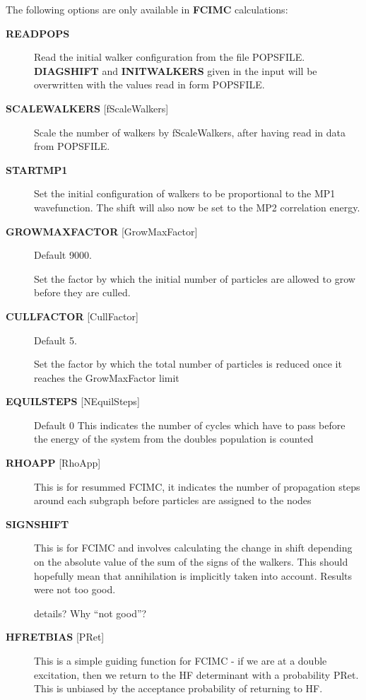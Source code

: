 \documentclass[openany,a4paper,10pt]{manual}
\begin{document}
The following options are only available in \textbf{FCIMC} calculations:
\begin{description}
\item[\textbf{READPOPS}]
Read the initial walker configuration from the file POPSFILE.
\textbf{DIAGSHIFT} and \textbf{INITWALKERS} given in the input will be
overwritten with the values read in form POPSFILE.

\item[\textbf{SCALEWALKERS} {[}fScaleWalkers{]}]
Scale the number of walkers by fScaleWalkers, after having read in data from POPSFILE.

\item[\textbf{STARTMP1}]
Set the initial configuration of walkers to be proportional to the MP1 wavefunction. The shift will also
now be set to the MP2 correlation energy.

\item[\textbf{GROWMAXFACTOR} {[}GrowMaxFactor{]}]
Default 9000.

Set the factor by which the initial number of particles are allowed to grow before
they are culled.

\item[\textbf{CULLFACTOR} {[}CullFactor{]}]
Default 5.

Set the factor by which the total number of particles is reduced once it reaches the GrowMaxFactor limit

\item[\textbf{EQUILSTEPS} {[}NEquilSteps{]}]
Default 0
This indicates the number of cycles which have to
pass before the energy of the system from the doubles
population is counted

\item[\textbf{RHOAPP} {[}RhoApp{]}]
This is for resummed FCIMC, it indicates the number of propagation steps
around each subgraph before particles are assigned to the nodes

\item[\textbf{SIGNSHIFT}]
This is for FCIMC and involves calculating the change in shift depending on
the absolute value of the sum of the signs of the walkers.  This should
hopefully mean that annihilation is implicitly taken into account. Results
were not too good.

\begin{notice}[note]
details?  Why ``not good''?
\end{notice}

\item[\textbf{HFRETBIAS} {[}PRet{]}]
This is a simple guiding function for FCIMC - if we are at a double
excitation, then we return to the HF determinant with a probability PRet.
This is unbiased by the acceptance probability of returning to HF.


\end{description}
\end{document}
